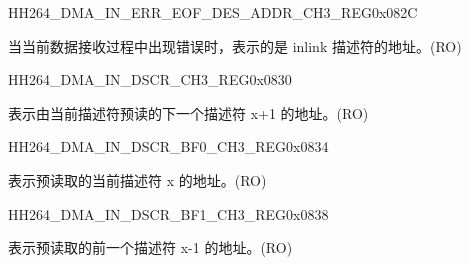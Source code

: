 \begin{register}{H}{H264\_DMA\_IN\_ERR\_EOF\_DES\_ADDR\_CH3\_REG}{0x082C}\label{regdesc:H264DMAINERREOFDESADDRCH3REG}
%
\regnewline%
\begin{regdesc}\begin{reglist}
\label{fielddesc:H264DMAINERREOFDESADDRCH3}\item [H264\_DMA\_IN\_ERR\_EOF\_DES\_ADDR\_CH3] 当当前数据接收过程中出现错误时，表示的是 inlink 描述符的地址。(RO)
\end{reglist}\end{regdesc}
\end{register}


\begin{register}{H}{H264\_DMA\_IN\_DSCR\_CH3\_REG}{0x0830}\label{regdesc:H264DMAINDSCRCH3REG}
%
\regnewline%
\begin{regdesc}\begin{reglist}
\label{fielddesc:H264DMAINLINKDSCRCH3}\item [H264\_DMA\_INLINK\_DSCR\_CH3] 表示由当前描述符预读的下一个描述符 x+1 的地址。(RO)
\end{reglist}\end{regdesc}
\end{register}


\begin{register}{H}{H264\_DMA\_IN\_DSCR\_BF0\_CH3\_REG}{0x0834}\label{regdesc:H264DMAINDSCRBF0CH3REG}
%
\regnewline%
\begin{regdesc}\begin{reglist}
\label{fielddesc:H264DMAINLINKDSCRBF0CH3}\item [H264\_DMA\_INLINK\_DSCR\_BF0\_CH3] 表示预读取的当前描述符 x 的地址。(RO)
\end{reglist}\end{regdesc}
\end{register}


\begin{register}{H}{H264\_DMA\_IN\_DSCR\_BF1\_CH3\_REG}{0x0838}\label{regdesc:H264DMAINDSCRBF1CH3REG}
%
\regnewline%
\begin{regdesc}\begin{reglist}
\label{fielddesc:H264DMAINLINKDSCRBF1CH3}\item [H264\_DMA\_INLINK\_DSCR\_BF1\_CH3] 表示预读取的前一个描述符 x-1 的地址。(RO)
\end{reglist}\end{regdesc}
\end{register}

